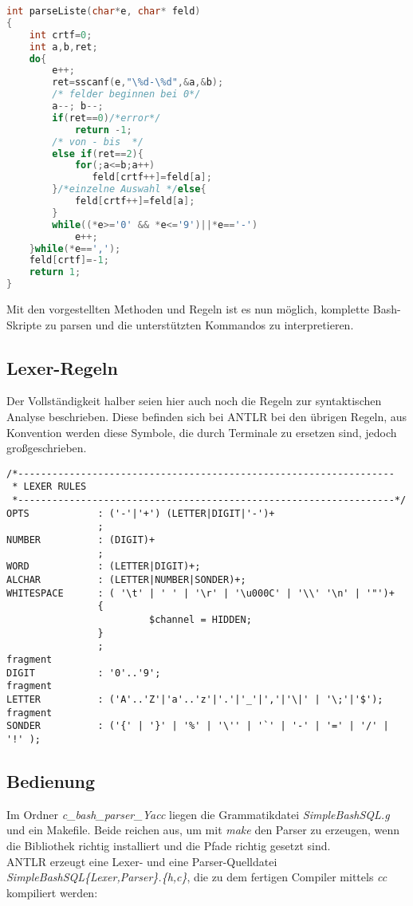 \begin{lstlisting}[language=C]
int parseListe(char*e, char* feld)
{
	int crtf=0;
	int a,b,ret;
	do{
		e++;
		ret=sscanf(e,"\%d-\%d",&a,&b);
		/* felder beginnen bei 0*/
		a--; b--;
		if(ret==0)/*error*/
			return -1;
		/* von - bis  */
		else if(ret==2){
			for(;a<=b;a++)
			   feld[crtf++]=feld[a];
		}/*einzelne Auswahl */else{
			feld[crtf++]=feld[a];
		}
		while((*e>='0' && *e<='9')||*e=='-')
			e++;
	}while(*e==',');
	feld[crtf]=-1;
	return 1;
}
\end{lstlisting}
Mit den vorgestellten Methoden und Regeln ist es nun möglich, komplette Bash-Skripte zu parsen und die unterstützten Kommandos zu interpretieren.

\subsection{Lexer-Regeln}
Der Vollständigkeit halber seien hier auch noch die Regeln zur syntaktischen Analyse beschrieben. Diese befinden sich bei ANTLR bei den übrigen Regeln, aus Konvention werden diese Symbole, die durch Terminale zu ersetzen sind, jedoch großgeschrieben.

\begin{lstlisting}
/*------------------------------------------------------------------
 * LEXER RULES
 *------------------------------------------------------------------*/
OPTS            : ('-'|'+') (LETTER|DIGIT|'-')+
                ;
NUMBER          : (DIGIT)+
                ;
WORD            : (LETTER|DIGIT)+;
ALCHAR          : (LETTER|NUMBER|SONDER)+;
WHITESPACE      : ( '\t' | ' ' | '\r' | '\u000C' | '\\' '\n' | '"')+
                {
                         $channel = HIDDEN;
                }
                ;
fragment
DIGIT           : '0'..'9';
fragment
LETTER          : ('A'..'Z'|'a'..'z'|'.'|'_'|','|'\|' | '\;'|'$');
fragment
SONDER          : ('{' | '}' | '%' | '\'' | '`' | '-' | '=' | '/' | '!' );
\end{lstlisting}


\subsection{Bedienung}
Im Ordner \textit{c\_bash\_parser\_Yacc} liegen die Grammatikdatei \textit{SimpleBashSQL.g} und ein Makefile. Beide reichen aus, um mit \textit{make} den Parser zu erzeugen, wenn die Bibliothek richtig installiert und die Pfade richtig gesetzt sind.\\
ANTLR erzeugt eine Lexer- und eine Parser-Quelldatei \textit{SimpleBashSQL\{Lexer,Parser\}.\{h,c\}}, die zu dem fertigen Compiler mittels \textit{cc} kompiliert werden:

